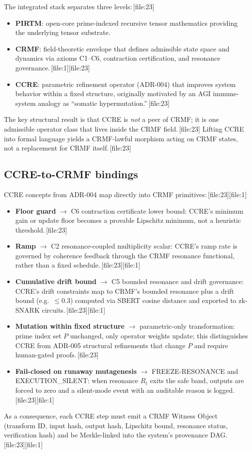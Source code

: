 \documentclass[11pt]{article}
\begin{document}
The integrated stack separates three levels:\,[file:23]
\begin{itemize}[leftmargin=1.5em]
  \item \textbf{PIRTM}: open-core prime-indexed recursive tensor mathematics providing the underlying tensor substrate.
  \item \textbf{CRMF}: field-theoretic envelope that defines admissible state space and dynamics via axioms C1--C6, contraction certification, and resonance governance.\,[file:1][file:23]
  \item \textbf{CCRE}: parametric refinement operator (ADR-004) that improves system behavior within a fixed structure, originally motivated by an AGI immune-system analogy as ``somatic hypermutation.''\,[file:23]
\end{itemize}
The key structural result is that CCRE is \emph{not} a peer of CRMF; it is one admissible operator class that lives inside the CRMF field.\,[file:23]
Lifting CCRE into formal language yields a CRMF-lawful morphism acting on CRMF states, not a replacement for CRMF itself.\,[file:23]

\subsection{CCRE-to-CRMF bindings}

CCRE concepts from ADR-004 map directly into CRMF primitives:\,[file:23][file:1]
\begin{itemize}[leftmargin=1.5em]
  \item \textbf{Floor guard} $\to$ C6 contraction certificate lower bound: CCRE's minimum gain or update floor becomes a provable Lipschitz minimum, not a heuristic threshold.\,[file:23]
  \item \textbf{Ramp} $\to$ C2 resonance-coupled multiplicity scalar: CCRE's ramp rate is governed by coherence feedback through the CRMF resonance functional, rather than a fixed schedule.\,[file:23][file:1]
  \item \textbf{Cumulative drift bound} $\to$ C5 bounded resonance and drift governance: CCRE's drift constraints map to CRMF's bounded resonance plus a drift bound (e.g.\ $\le 0.3$) computed via SBERT cosine distance and exported to zk-SNARK circuits.\,[file:23][file:1]
  \item \textbf{Mutation within fixed structure} $\to$ parametric-only transformation: prime index set $P$ unchanged, only operator weights update; this distinguishes CCRE from ADR-005 structural refinements that change $P$ and require human-gated proofs.\,[file:23]
  \item \textbf{Fail-closed on runaway mutagenesis} $\to$ FREEZE-RESONANCE and EXECUTION\_SILENT: when resonance $R_t$ exits the safe band, outputs are forced to zero and a silent-mode event with an auditable reason is logged.\,[file:23][file:1]
\end{itemize}
As a consequence, each CCRE step must emit a CRMF Witness Object (transform ID, input hash, output hash, Lipschitz bound, resonance status, verification hash) and be Merkle-linked into the system's provenance DAG.\,[file:23][file:1]
\end{document}
